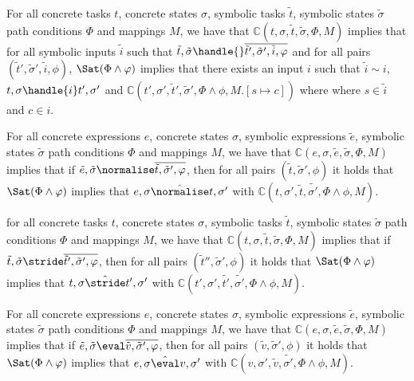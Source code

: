 \begin{lemma}
  \label{lem:soundhandle}

  For all concrete tasks $t$, concrete states $\sigma$, symbolic tasks $\tilde{t}$, symbolic states $\tilde{\sigma}$ path conditions $\Phi$ and mappings $M$,
  we have that $\mathds{C}(t,\sigma,\tilde{t},\tilde{\sigma},\Phi,M)$ implies
  that for all symbolic inputs $\tilde{i}$ such that $\tilde{t},\tilde{\sigma}\handle{}\overline{\tilde{t}',\tilde{\sigma}',\tilde{i},\phi}$ and
  for all pairs $(\tilde{t}',\tilde{\sigma}',\tilde{i},\phi)$,
  $\Sat(\Phi\land\phi)$ implies that there exists an input $i$ such that $\tilde{i}\sim i$,  $t,\sigma\handle{i}t',\sigma'$ and $\mathds{C}(t',\sigma',\tilde{t}',\tilde{\sigma}',\Phi\land\phi,M.[s\mapsto c])$ where where $s\in\tilde{i}$ and $c\in i$.

\end{lemma}



\begin{lemma}
  \label{lem:soundnorm}
  For all concrete expressions $e$, concrete states $\sigma$, symbolic expressions $\tilde{e}$, symbolic states $\tilde{\sigma}$ path conditions $\Phi$ and mappings $M$,
  we have that $\mathds{C}(e,\sigma,\tilde{e},\tilde{\sigma},\Phi,M)$ implies
  that if $\tilde{e},\tilde{\sigma}\normalise\overline{\tilde{t},\tilde{\sigma}',\phi}$,
  then for all pairs $(\tilde{t},\tilde{\sigma}',\phi)$ it holds that $\Sat(\Phi\land\phi)$ implies
  that $e,\sigma\hat{\normalise}t,\sigma'$ with $\mathds{C}(t,\sigma',\tilde{t},\tilde{\sigma'},\Phi\land\phi,M)$.
\end{lemma}

\begin{lemma}
  for all concrete tasks $t$, concrete states $\sigma$, symbolic tasks $\tilde{t}$, symbolic states $\tilde{\sigma}$ path conditions $\Phi$ and mappings $M$,
  we have that $\mathds{C}(t,\sigma,\tilde{t},\tilde{\sigma},\Phi,M)$ implies
  that if $\tilde{t},\tilde{\sigma}\stride\overline{\tilde{t}',\tilde{\sigma}',\phi}$,
  then for all pairs $(\tilde{t}'',\tilde{\sigma}',\phi)$ it holds that $\Sat(\Phi\land\phi)$ implies
  that $t,\sigma\hat{\stride}t',\sigma'$ with $\mathds{C}(t',\sigma',\tilde{t'},\tilde{\sigma'},\Phi\land\phi,M)$.
\end{lemma}

\begin{lemma}
  For all concrete expressions $e$, concrete states $\sigma$, symbolic expressions $\tilde{e}$, symbolic states $\tilde{\sigma}$ path conditions $\Phi$ and mappings $M$,
  we have that $\mathds{C}(e,\sigma,\tilde{e},\tilde{\sigma},\Phi,M)$ implies
  that if $\tilde{e},\tilde{\sigma}\eval\overline{\tilde{v},\tilde{\sigma}',\phi}$,
  then for all pairs $(\tilde{v},\tilde{\sigma}',\phi)$ it holds that $\Sat(\Phi\land\phi)$ implies
  that $e,\sigma\hat{\eval}v,\sigma'$ with $\mathds{C}(v,\sigma',\tilde{v},\tilde{\sigma'},\Phi\land\phi,M)$.
\end{lemma}




